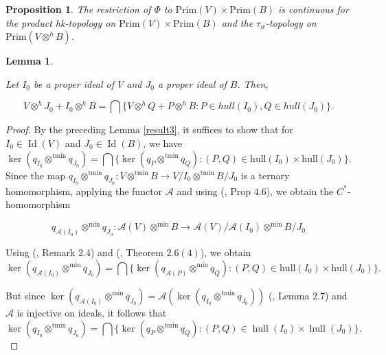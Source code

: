 \documentclass{birkjour}
\newtheorem{lem}[thm]{Lemma}
\newtheorem{prop}[thm]{Proposition}
\theoremstyle{definition}
\theoremstyle{remark}
\numberwithin{equation}{section}
\begin{document}
\begin{prop} \label{fourmain}
    The restriction of $\Phi$ to $\text{Prim}(V) \times \text{Prim}(B)$ is continuous for the 
product \textit{hk}-topology on $\text{Prim}(V) \times \text{Prim}(B)$ and the $\tau_w$-topology on $\text{Prim}(V \otimes^h B)$.
\end{prop}







\begin{lem}\label{result4}

Let $I_0$ be a proper ideal of $V$ and $J_0$ a proper ideal of $B$. Then, 

\[
V\otimes^{h} J_0 + I_0 \otimes^{h} B = \bigcap \{ V\otimes^{h} Q + P \otimes^{h} B : P \in hull(I_0), Q\in hull(J_0) \}.
\]
\end{lem}

\begin{proof}




By the preceding Lemma \ref{result3}, it suffices to show that
for $I_0\in \operatorname{Id}(V) $ and $J_0 \in \operatorname{Id}(B)$, we have
\[\ker(q_{I_0} \otimes^{\text{tmin}} q_{J_0}) 
= \bigcap\{ \ker(q_P \otimes^{\text{tmin}} q_Q)  : (P, Q) \in \text{hull}(I_0) \times \text{hull}(J_0) \} .
\] 
Since the map \( q_{I_0} \otimes^{\text{tmin}} q_{J_0} : V\otimes^{\text{tmin}} B \to V/I_0 \otimes^{\text{tmin}} B/J_0 \) is a ternary homomorphism, applying the functor $\mathcal{A}$ and using (\cite{AKKKK}, Prop $4.6$), we obtain the $C^{\ast}$-homomorphism 

\[
 q_{\mathcal{A}(I_0)} \otimes^{\text{min}} q_{J_0}  : \mathcal{A}(V) \otimes^{\text{min}} B \to \mathcal{A}(V)/\mathcal{A} (I_0) \otimes^{\text{min}} B/J_0
\]

Using  (\cite{Lazer}, Remark $2.4$)  and (\cite{AAV}, Theorem $2.6(4)$), we obtain
 $$\ker( q_{\mathcal{A}(I_0)} \otimes^{\text{min}} q_{J_0})=  \bigcap\{ \ker(q_{\mathcal{A}(P)} \otimes^{\text{min}} q_Q)  : (P, Q) \in \text{hull}(I_0) \times \text{hull}(J_0) \}.$$

But since  $\ker( q_{\mathcal{A}(I_0)} \otimes^{\text{min}} q_{J_0}) = \mathcal{A} (\ker(q_{I_0} \otimes^{\text{tmin}} q_{J_0}))$ (\cite{AAV}, Lemma $2.7$) and $\mathcal{A}$ is injective on ideals, it follows that \[
\ker(q_{I_0} \otimes^{\text{tmin}} q_{J_0}) = \bigcap \{ \ker(q_P \otimes^{\text{tmin}} q_Q) : (P, Q) \in \operatorname{hull}(I_0) \times \operatorname{hull}(J_0) \}.
\]  
  
\end{proof}
\end{document}
